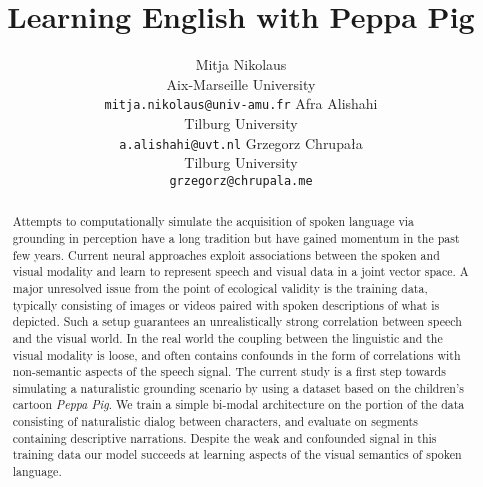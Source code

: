 \documentclass[11pt,a4paper]{article}
\begin{document}
\title{Learning English with Peppa Pig}

\author{Mitja Nikolaus\\
  Aix-Marseille University\\
  \texttt{mitja.nikolaus@univ-amu.fr}
  \And
  Afra Alishahi\\
  Tilburg University\\
  \texttt{a.alishahi@uvt.nl}
  \AND
  Grzegorz Chrupała\\
  Tilburg University\\
  \texttt{grzegorz@chrupala.me}}

\date{}


\maketitle
\begin{abstract}
  Attempts to computationally simulate the acquisition of spoken
  language via grounding in perception have a long tradition
  but have gained momentum in the past few years.  Current neural
  approaches exploit associations between the spoken and
  visual modality and learn to represent speech and visual data
  in a joint vector space. A major unresolved issue from the point
  of ecological validity is the training data, typically consisting of
  images or videos paired with spoken descriptions of what is
  depicted. Such a setup guarantees an unrealistically strong
  correlation between speech and the visual world.  In
  the real world the coupling between the linguistic and the visual modality is
  loose, and often contains confounds in the form of correlations with
  non-semantic aspects of the speech signal. The current study is a
  first step towards simulating a naturalistic grounding scenario by
  using a dataset based on the children's cartoon {\it Peppa Pig}. We
  train a simple bi-modal architecture on the portion of the data
  consisting of naturalistic dialog between characters, and evaluate
  on segments containing descriptive narrations. Despite the weak and confounded
  signal in this training data our model succeeds at learning aspects
  of the visual semantics of spoken language.
\end{abstract}










%
\end{document}
